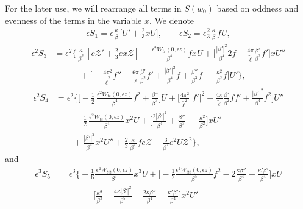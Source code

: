 \documentclass[10pt, reqno]{amsart}
\numberwithin{equation}{section}
\theoremstyle{definition}
\begin{document}
{{\medskip
\subsubsection{}
For  the later use, we will rearrange all terms in $S(w_0)$ based on oddness and evenness of the terms in the variable $x$.
We denote
\begin{align}\label{S1S2}
\epsilon S_1 = \epsilon \frac{ \kappa}{\, \beta\, } \Big[ U'+\frac{2}{3} x U\Big],
\qquad
\epsilon S_2 = \epsilon\frac{2}{3} \frac{ \kappa}{\, \beta\, } f U,
\end{align}
\begin{align}\label{expression of s3}
 \epsilon^2 S_3& = \epsilon^2
 \Bigg\{\frac{\kappa}{\, \beta^2\, }\left[ e {\mathcal Z}'+\frac 23 e x\mathcal Z \right]
 -\,\frac{\epsilon^2W_{tt}(0, \epsilon z)}{\beta^4}f xU
+\Big[\frac{|\beta'|^2}{\beta^4} 2f
-\frac{4\pi}{{\tilde\ell}}\frac{\beta'}{\beta^2}f'
\Big]xU''
\nonumber\\[2mm]
&\qquad\quad
+ \Big[
-\frac{4\pi^2}{{\tilde\ell}^2}f''
-\frac{6\pi}{\tilde\ell} \frac{\beta'}{\beta^2} f'
+\frac{|\beta'|^2}{\beta^4}f
+\frac{\beta''} {\beta^3}f
\,-\,\frac{\kappa^2}{\beta^2}f
\Big]U'
\Bigg\},
\end{align}
\begin{align}\label{expression of s4}
 \epsilon^2 S_4& =\epsilon^2
 \Bigg\{ \Big[
-\frac{1}{2}\, \frac{\epsilon^2W_{tt}(0, \epsilon z)}{\beta^4}f^2 + \frac{\beta''} {\beta^3} \Big]U
+\Big[\frac{4\pi^2}{{\tilde\ell}^2}|f'|^2
-\frac{4\pi}{{\tilde\ell}}\frac{\beta'}{\beta^2}ff'
+\frac{|\beta'|^2}{\beta^4} f^2
\Big]U''
\nonumber\\[2mm]
&\qquad -\frac{1}{2}\, \frac{\epsilon^2W_{tt}(0, \epsilon z)}{\beta^4} x^2U
+\Big[\frac{2|\beta'|^2}{\beta^4}
+\frac{\beta''} {\beta^3}
\,-\,\frac{\kappa^2}{\beta^2}
\Big]xU'
\nonumber\\[2mm]
&\qquad+\frac{|\beta'|^2}{\beta^4} x^2 U''
+\frac 23 \frac{\kappa}{\, \beta^2\, } fe{\mathcal Z}
+\frac3{\beta^2}e^2 U {\mathcal Z }^2
\Bigg\} ,
\end{align}
and
\begin{align}\label{S5}
 \epsilon^3 S_5& =
 \epsilon^3 \Bigg\{-\frac{1}{6} \frac{\, \epsilon^2 W_{ttt}(0, \epsilon z)}{\beta^5} x^3 U
 + \Big[- \frac{1}{2} \frac{\epsilon^2 W_{ttt}(0, \epsilon z)}{\beta^5}f^2-2 \frac{\kappa\beta''}{\beta^4} +\frac{\kappa'\beta'} {\beta^4} \Big] x U
\nonumber\\[2mm]
 & \qquad\quad
 + \Big[ \frac{\kappa^3}{\beta^3}-\frac{4\kappa|\beta'|^2}{\beta^5}-\frac{2\kappa\beta''}{\beta^4} + \frac{\kappa'\beta'} {\beta^4} \Big]x^2U'

\end{align}}}
\end{document}
